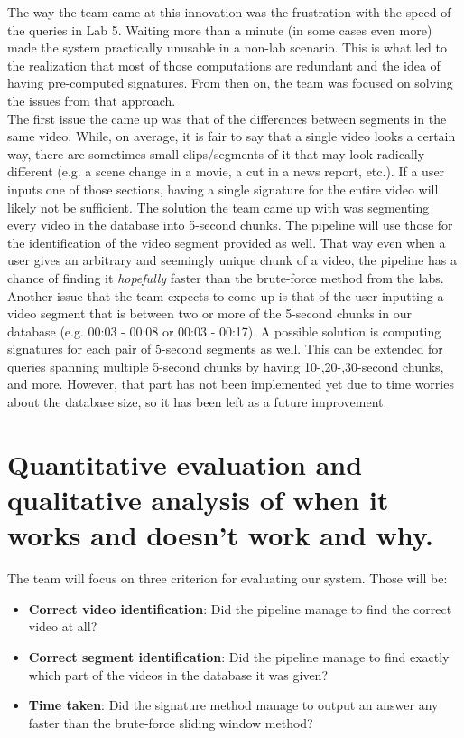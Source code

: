 \documentclass{article}
\newcommand\tab[1][1cm]{\hspace*{#1}}
\begin{document}
 \tab The way the team came at this innovation was the frustration with the speed of the queries in Lab 5. Waiting more than a minute (in some cases even more) made the system practically unusable in a non-lab scenario. This is what led to the realization that most of those computations are redundant and the idea of having pre-computed signatures. From then on, the team was focused on solving the issues from that approach.
\\ \tab The first issue the came up was that of the differences between segments in the same video. While, on average, it is fair to say that a single video looks a certain way, there are sometimes small clips/segments of it that may look radically different (e.g. a scene change in a movie, a cut in a news report, etc.). If a user inputs one of those sections, having a single signature for the entire video will likely not be sufficient. The solution the team came up with was segmenting every video in the database into 5-second chunks. The pipeline will use those for the identification of the video segment provided as well. That way even when a user gives an arbitrary and seemingly unique chunk of a video, the pipeline has a chance of finding it \textit{hopefully} faster than the brute-force method from the labs. 
\\ \tab Another issue that the team expects to come up is that of the user inputting a video segment that is between two or more of the 5-second chunks in our database (e.g. 00:03 - 00:08 or 00:03 - 00:17). A possible solution is computing signatures for each pair of 5-second segments as well. This can be extended for queries spanning multiple 5-second chunks by having 10-,20-,30-second chunks, and more. However, that part has not been implemented yet due to time worries about the database size, so it has been left as a future improvement. 

\section*{Quantitative evaluation and qualitative analysis of when it works and doesn't work
and why.}

The team will focus on three criterion for evaluating our system. Those will be: \begin{itemize}
    \item \textbf{Correct video identification}: Did the pipeline manage to find the correct video at all?
    \item \textbf{Correct segment identification}: Did the pipeline manage to find exactly which part of the videos in the database it was given?
    \item \textbf{Time taken}: Did the signature method manage to output an answer any faster than the brute-force sliding window method?
\end{itemize}
\end{document}

